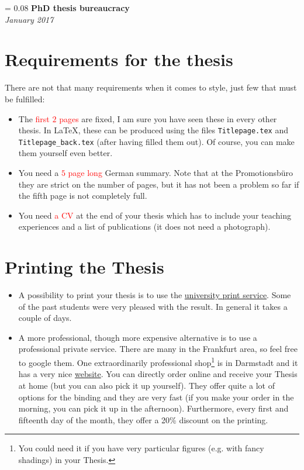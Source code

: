 \documentclass[a4paper]{article}
\newlength{\titleVerticalSpacing}
\newcommand{\myTitle}[2]{%
    \begingroup
        \titleVerticalSpacing = 0.08\textheight
        \centering
        \vspace*{\titleVerticalSpacing}
        {\Huge\bfseries #1}\\[\baselineskip]
        {\itshape #2}\\[3\baselineskip]
    \endgroup
}
\begin{document}
    
    \myTitle{PhD thesis bureaucracy}{January 2017}

    \section*{Requirements for the thesis}
        There are not that many requirements when it comes to style, just few that must be fulfilled:
        \begin{itemize}
            \item The \textcolor{red}{first $2$ pages} are fixed, I am sure you have seen these in every other thesis.
                  In \LaTeX, these can be produced using the files \texttt{Titlepage.tex} and \texttt{Titlepage\_back.tex} (after having filled them out).
                  Of course, you can make them yourself even better.
            \item You need a \textcolor{red}{$5$ page long} German summary. Note that at the Promotionsb\"uro they are strict on the number of pages, but it has not been a problem so far if the fifth page is not completely full.
            \item You need \textcolor{red}{a CV} at the end of your thesis which has to include your teaching experiences and a list of publications (it does not need a photograph).
        \end{itemize}
        
        
    \section*{Printing the Thesis}
        \begin{itemize}
            \item A possibility to print your thesis is to use the \href{http://druck.uni-frankfurt.de/druckzentrum/}{university print service}.
                  Some of the past students were very pleased with the result.
                  In general it takes a couple of days.
            \item A more professional, though more expensive alternative is to use a professional private service.
                  There are many in the Frankfurt area, so feel free to google them.
                  One extraordinarily professional shop\footnote{You could need it if you have very particular figures (e.g. with fancy shadings) in your Thesis.} is in Darmstadt and it has a very nice \href{http://www.der-felger.de/}{website}.
                  You can directly order online and receive your Thesis at home (but you can also pick it up yourself).
                  They offer quite a lot of options for the binding and they are very fast (if you make your order in the morning, you can pick it up in the afternoon). Furthermore, every first and fifteenth day of the month, they offer a 20\% discount on the printing.
        \end{itemize}
        
\end{document}
